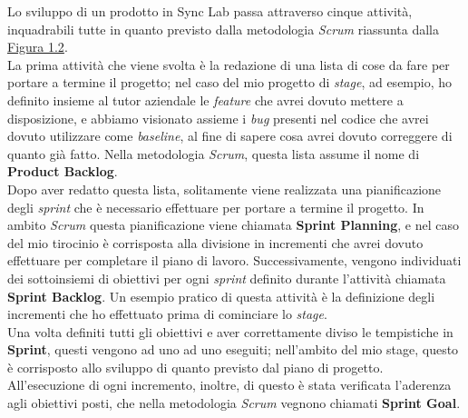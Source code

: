 Lo sviluppo di un prodotto in Sync Lab passa attraverso cinque attività, inquadrabili tutte in quanto previsto dalla metodologia \textit{Scrum} riassunta dalla \hyperref[img:scrum]{Figura 1.2}. \\
La prima attività che viene svolta è la redazione di una lista di cose da fare per portare a termine il progetto; nel caso del mio progetto di \textit{stage}, ad esempio, ho definito insieme al tutor aziendale le \textit{feature} che avrei dovuto mettere a disposizione, e abbiamo visionato assieme i \textit{bug} presenti nel codice che avrei dovuto utilizzare come \textit{baseline}, al fine di sapere cosa avrei dovuto correggere di quanto già fatto. Nella metodologia \textit{Scrum}, questa lista assume il nome di \textbf{Product Backlog}. \\
Dopo aver redatto questa lista, solitamente viene realizzata una pianificazione degli \textit{sprint} che è necessario effettuare per portare a termine il progetto. In ambito \textit{Scrum} questa pianificazione viene chiamata \textbf{Sprint Planning}, e nel caso del mio tirocinio è corrisposta alla divisione in incrementi che avrei dovuto effettuare per completare il piano di lavoro. Successivamente, vengono individuati dei sottoinsiemi di obiettivi per ogni \textit{sprint} definito durante l'attività chiamata \textbf{Sprint Backlog}. Un esempio pratico di questa attività è la definizione degli incrementi che ho effettuato prima di cominciare lo \textit{stage}. \\
Una volta definiti tutti gli obiettivi e aver correttamente diviso le tempistiche in \textbf{Sprint}, questi vengono ad uno ad uno eseguiti; nell'ambito del mio stage, questo è corrisposto allo sviluppo di quanto previsto dal piano di progetto. All'esecuzione di ogni incremento, inoltre, di questo è stata verificata l'aderenza agli obiettivi posti, che nella metodologia \textit{Scrum} vegnono chiamati \textbf{Sprint Goal}.

